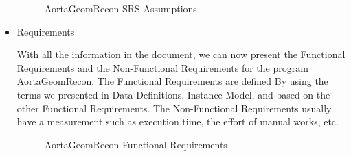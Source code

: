 \begin{itemize}
\begin{figure}[H]
    \centering
    \caption[AortaGeomRecon SRS Assumptions]{AortaGeomRecon SRS Assumptions}
    \label{fig_agr_srs_a}
\end{figure}


\item Requirements

With all the information in the document, we can now present the Functional Requirements and the Non-Functional Requirements for the program AortaGeomRecon. The Functional Requirements are defined By using the terms we presented in Data Definitions, Instance Model, and based on the other Functional Requirements. The Non-Functional Requirements usually have a measurement such as execution time, the effort of manual works, etc.

\begin{figure}[H]
    \centering
    \caption[AortaGeomRecon Functional Requirements]{AortaGeomRecon Functional Requirements}
    \label{fig_agr_fr}
\end{figure}


\end{itemize}
